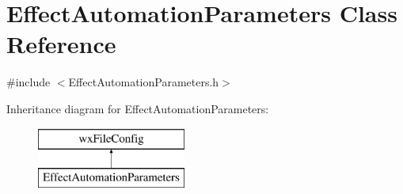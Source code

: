 \hypertarget{class_effect_automation_parameters}{}\section{Effect\+Automation\+Parameters Class Reference}
\label{class_effect_automation_parameters}


{\ttfamily \#include $<$Effect\+Automation\+Parameters.\+h$>$}

Inheritance diagram for Effect\+Automation\+Parameters\+:\begin{figure}[H]
\begin{center}
\leavevmode
\includegraphics[height=2.000000cm]{class_effect_automation_parameters}
\end{center}
\end{figure}
